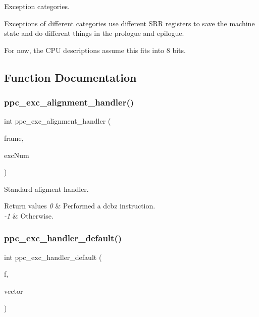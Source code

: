 Exception categories. 

Exceptions of different categories use different S\+RR registers to save the machine state and do different things in the prologue and epilogue.

For now, the C\+PU descriptions assume this fits into 8 bits. 

\subsection{Function Documentation}
\mbox{\label{group__ppc__exc_gada88a03f6f9d48393a2dae499774af9e}} 
\subsubsection{\texorpdfstring{ppc\_exc\_alignment\_handler()}{ppc\_exc\_alignment\_handler()}}
{\footnotesize\ttfamily int ppc\+\_\+exc\+\_\+alignment\+\_\+handler (\begin{DoxyParamCaption}\item[{\mbox{\hyperlink{structCPU__Exception__frame}{B\+S\+P\+\_\+\+Exception\+\_\+frame}} $\ast$}]{frame,  }\item[{unsigned}]{exc\+Num }\end{DoxyParamCaption})}



Standard aligment handler. 


\begin{DoxyRetVals}{Return values}
{\em 0} & Performed a dcbz instruction. \\
\hline
{\em -\/1} & Otherwise. \\
\hline
\end{DoxyRetVals}
\mbox{\label{group__ppc__exc_ga61ffc165cc3523a30f39b5815814081b}} 
\subsubsection{\texorpdfstring{ppc\_exc\_handler\_default()}{ppc\_exc\_handler\_default()}}
{\footnotesize\ttfamily int ppc\+\_\+exc\+\_\+handler\+\_\+default (\begin{DoxyParamCaption}\item[{\mbox{\hyperlink{structCPU__Exception__frame}{B\+S\+P\+\_\+\+Exception\+\_\+frame}} $\ast$}]{f,  }\item[{unsigned int}]{vector }\end{DoxyParamCaption})}



